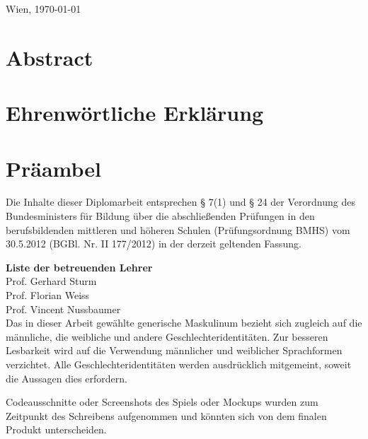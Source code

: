 \documentclass[
    headings=optiontotocandhead,%
    twoside,
    numbers=noenddot,%
    toc=flat, %
    12pt, %
    titlepage, %
    parskip=full, %
    listof=totoc, %
    listof=flat, %
    numbers=noenddot, %
    bibliography=totoc, %
    a4paper,DIV=14,
    BCOR=15mm,
]{scrbook}
\begin{document}
\begin{titlepage}
\begin{center}
\vfill

Wien, \today
\par\end{center}

\end{titlepage}



\chapter{Abstract}


\chapter*{Ehrenwörtliche Erklärung}


\chapter{Präambel}
Die Inhalte dieser Diplomarbeit entsprechen § 7(1) und § 24 der Verordnung des Bundesministers für Bildung über die abschließenden Prüfungen in den berufsbildenden mittleren und höheren Schulen (Prüfungsordnung BMHS) vom 30.5.2012 (BGBl. Nr. II 177/2012) in der derzeit geltenden Fassung.

\textbf{Liste der betreuenden Lehrer} \\
Prof. Gerhard Sturm \\ %
Prof. Florian Weiss \\
Prof. Vincent Nussbaumer \\

Das in dieser Arbeit gewählte generische Maskulinum bezieht sich zugleich auf die männliche, die weibliche und andere
Geschlechteridentitäten. Zur besseren Lesbarkeit wird auf die Verwendung männlicher und weiblicher Sprachformen verzichtet.
Alle Geschlechteridentitäten werden ausdrücklich mitgemeint, soweit die Aussagen dies erfordern.

Codeausschnitte oder Screenshots des Spiels oder Mockups wurden zum Zeitpunkt des Schreibens aufgenommen und könnten
sich von dem finalen Produkt unterscheiden.

\cleardoublepage{}
\tableofcontents{}
\cleardoublepage{}
\listoffigures
\end{document}
